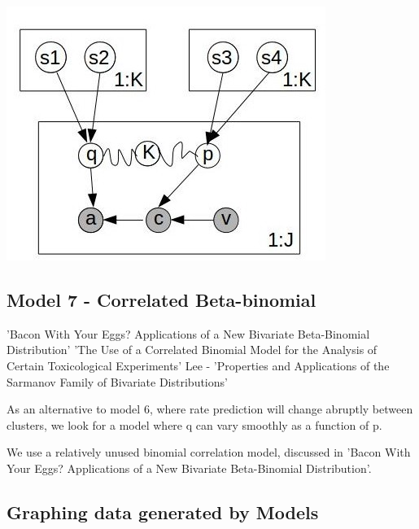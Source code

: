 \documentclass[11pt,a4,singlespacing,titlepagenumber=on]{scrreprt}
\numberwithin{equation}{chapter} %
\theoremstyle{remark}
\begin{document}
\includegraphics{GraphMod.jpg}

\subsection{Model 7 - Correlated Beta-binomial }

'Bacon With Your Eggs? Applications of a New Bivariate Beta-Binomial Distribution'
'The Use of a Correlated Binomial Model for the Analysis of Certain Toxicological Experiments'
Lee - 'Properties and Applications of the Sarmanov Family of Bivariate Distributions'

As an alternative to model 6, where rate prediction will change abruptly between clusters, we look for a model where q can vary smoothly as a function of p.

We use a relatively unused binomial correlation model, discussed in 'Bacon With Your Eggs? Applications of a New Bivariate Beta-Binomial Distribution'. 

\subsection{Graphing data generated by Models}
\end{document}
